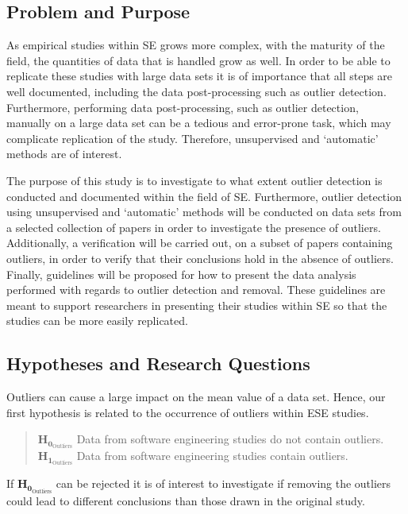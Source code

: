\subsection{Problem and Purpose}
\label{sec:introduction-problem}
As empirical studies within SE grows more complex, with the maturity of the field, the quantities of data that is handled grow as well. In order to be able to replicate these studies with large data sets it is of importance that all steps are well documented, including the data post-processing such as outlier detection. Furthermore, performing data post-processing, such as outlier detection, manually on a large data set can be a tedious and error-prone task, which may complicate replication of the study. Therefore, unsupervised and `automatic' methods are of interest.




The purpose of this study is to investigate to what extent outlier detection is conducted and documented within the field of SE. Furthermore, outlier detection using unsupervised and `automatic' methods will be conducted on data sets from a selected collection of papers in order to investigate the presence of outliers. Additionally, a verification will be carried out, on a subset of papers containing outliers, in order to verify that their conclusions hold in the absence of outliers. Finally, guidelines will be proposed for how to present the data analysis performed with  regards to outlier detection and removal. These guidelines are meant to support researchers in presenting their studies within SE so that the studies can be more easily replicated.




\subsection{Hypotheses and Research Questions}
Outliers can cause a large impact on the mean value of a data set. Hence, our first hypothesis is related to the occurrence of outliers within ESE studies.


\begin{quote}
$\mathbf{H_{0_{\mathrm{Outliers}}}}$ Data from software engineering studies do not contain outliers.
\\$\mathbf{H_{1_{\mathrm{Outliers}}}}$ Data from software engineering studies contain outliers.
\end{quote}


If  $\mathbf{H_{0_{\mathrm{Outliers}}}}$ can be rejected it is of interest to investigate if removing the outliers could lead to different conclusions than those drawn in the original study. 


